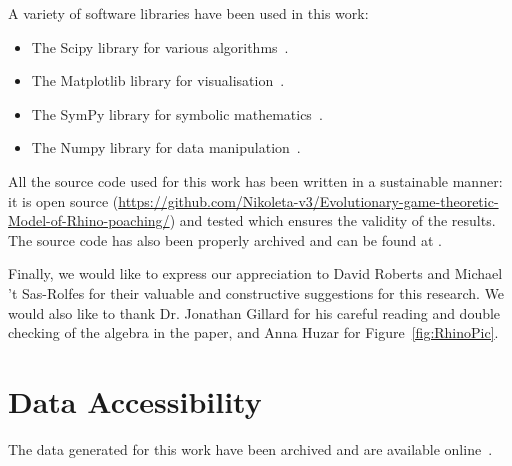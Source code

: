 \documentclass[10pt]{article}
\begin{document}
A variety of software libraries have been used in this work:

\begin{itemize}
    \item The Scipy library for various algorithms~\cite{scipy}.
    \item The Matplotlib library for visualisation~\cite{hunter2007matplotlib}.
    \item The SymPy library for symbolic mathematics~\cite{sympy}.
    \item The Numpy library for data manipulation~\cite{walt2011numpy}.
\end{itemize}

All the source code used for this work has been written in a sustainable manner: it is
open source (\url{https://github.com/Nikoleta-v3/Evolutionary-game-theoretic-Model-of-Rhino-poaching/})
and tested which ensures the validity of the results. The source code
has also been properly archived and can be found at \cite{Evorepo2018}.

Finally, we would like to express our appreciation to David Roberts and Michael 't
Sas-Rolfes for their valuable and constructive suggestions for this research.
We would also like to thank
Dr. Jonathan Gillard for his careful reading and double checking of the algebra in the paper,
and Anna Huzar for Figure~\ref{fig:RhinoPic}.

\section*{Data Accessibility}

The data generated for this work have been archived and are available
online~\cite{Glynatsi2017}.



\end{document}
